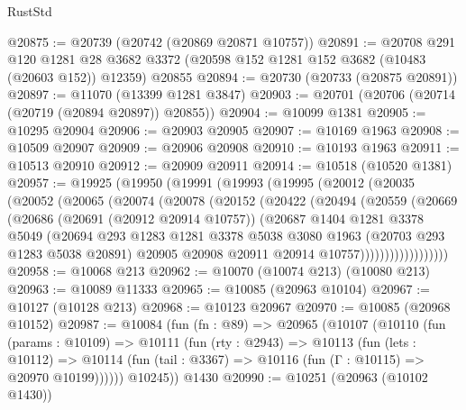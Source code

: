 \begin{lexlean}{RustStd}
\begin{coremodule}
@20875 := @20739 (@20742 (@20869 @20871 @10757))
@20891 := @20708
    @291
    @120
    @1281
    @28
    @3682
    @3372
    (@20598 @152 @1281 @152 @3682 (@10483 (@20603 @152)) @12359)
    @20855
@20894 := @20730 (@20733 (@20875 @20891))
@20897 := @11070 (@13399 @1281 @3847)
@20903 := @20701 (@20706 (@20714 (@20719 (@20894 @20897)) @20855))
@20904 := @10099 @1381
@20905 := @10295 @20904
@20906 := @20903 @20905
@20907 := @10169 @1963
@20908 := @10509 @20907
@20909 := @20906 @20908
@20910 := @10193 @1963
@20911 := @10513 @20910
@20912 := @20909 @20911
@20914 := @10518 (@10520 @1381)
@20957 := @19925
    (@19950
      (@19991
        (@19993
          (@19995
            (@20012
              (@20035
                (@20052
                  (@20065
                    (@20074
                      (@20078
                        (@20152
                          (@20422
                            (@20494
                              (@20559
                                (@20669
                                  (@20686
                                    (@20691 (@20912 @20914 @10757))
                                    (@20687
                                      @1404
                                      @1281
                                      @3378
                                      @5049
                                      (@20694
                                        @293
                                        @1283
                                        @1281
                                        @3378
                                        @5038
                                        @3080
                                        @1963
                                        (@20703 @293 @1283 @5038 @20891)
                                        @20905
                                        @20908
                                        @20911
                                        @20914
                                        @10757))))))))))))))))))
@20958 := @10068 @213
@20962 := @10070 (@10074 @213) (@10080 @213)
@20963 := @10089 @11333
@20965 := @10085 (@20963 @10104)
@20967 := @10127 (@10128 @213)
@20968 := @10123 @20967
@20970 := @10085 (@20968 @10152)
@20987 := @10084
    (fun (fn : @89) =>
    @20965
      (@10107
        (@10110
          (fun (params : @10109) =>
          @10111
            (fun (rty : @2943) =>
            @10113
              (fun (lets : @10112) =>
              @10114 (fun (tail : @3367) => @10116 (fun (Γ : @10115) => @20970 @10199))))))
        @10245))
    @1430
@20990 := @10251 (@20963 (@10102 @1430))

\end{coremodule}
\end{lexlean}
